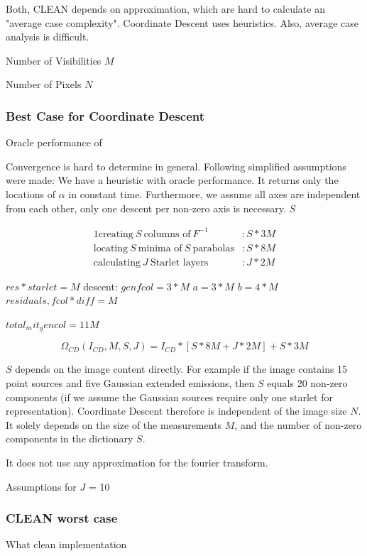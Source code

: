 Both, CLEAN depends on approximation, which are hard to calculate an "average case complexity". 
Coordinate Descent uses heuristics. Also, average case analysis is difficult. 

Number of Visibilities $M$

Number of Pixels $N$

\subsubsection{Best Case for Coordinate Descent}
Oracle performance of 

Convergence is hard to determine in general. Following simplified assumptions were made: We have a heuristic with oracle performance. It returns only the locations of $\alpha$ in constant time. Furthermore, we assume all axes are independent from each other, only one descent per non-zero axis is necessary.
$S$

\begin{alignat*}{1}
	\text{creating} \:S\: \text{columns of}\: F^{-1} &: S*3M\\
	\text{locating} \:S\: \text{minima of} \:S\: \text{parabolas} &: S*8M\\
	\text{calculating} \:J\: \text{Starlet layers} &: J * 2M
\end{alignat*}


$res * starlet = M$
descent:
$gen fcol = 3*M$
$a = 3 * M$
$b = 4 * M$
$residuals, fcol*diff =  M$

$total_mit_gencol = 11M$

\begin{equation}\label{results:cd:omega}
	\Omega_{CD}(I_{CD}, M, S, J) = I_{CD} * [S * 8M + J * 2M] + S*3M
\end{equation}

$S$ depends on the image content directly. For example if the image contains 15 point sources and five Gaussian extended emissions, then $S$ equals 20 non-zero components (if we assume the Gaussian sources require only one starlet for representation). Coordinate Descent therefore is independent of the image size $N$. It solely depends on the size of the measurements $M$, and the number of non-zero components in the dictionary $S$. 

It does not use any approximation for the fourier transform.

Assumptions for $J$ = 10

\subsubsection{CLEAN worst case}
What clean implementation

